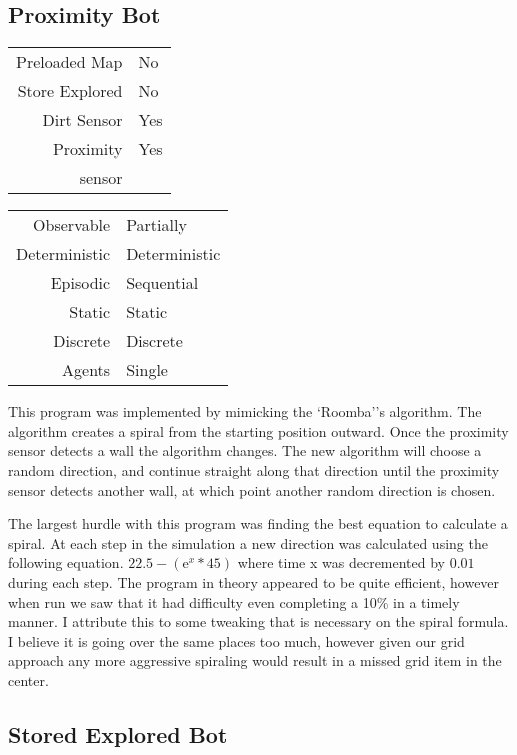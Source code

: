 \documentclass[letterpaper]{article}
\begin{document}
\subsection{Proximity Bot}

\begin{tabular}{ r | l }  
	Preloaded Map 		& No \\
	Store Explored 		& No \\
	Dirt Sensor 		& Yes \\
	Proximity  		 	& Yes \\
	sensor 					 \\
\end{tabular}
\quad
\begin{tabular}{ r | l }  
	Observable		& Partially		\\
	Deterministic	& Deterministic \\
	Episodic		& Sequential 	\\
	Static		 	& Static 		\\
	Discrete 		& Discrete 		\\
	Agents		 	& Single 		\\	
\end{tabular} 
 	
 		
 		
This program was implemented by mimicking the `Roomba''s algorithm.  The algorithm creates a spiral from the starting position outward.  Once the proximity sensor detects a wall the algorithm changes.  The new algorithm will choose a random direction, and continue straight along that direction until the proximity sensor detects another wall, at which point another random direction is chosen.  

The largest hurdle with this program was finding the best equation to calculate a spiral.  At each step in the simulation a new direction was calculated using the following equation.
$ 22.5 - (\mathrm {e} ^ x * 45)$
where time x was decremented by $0.01$ during each step.  The program in theory appeared to be quite efficient, however when run we saw that it had difficulty even completing a 10\% in a timely manner.  I attribute this to some tweaking that is necessary on the spiral formula.  I believe it is going over the same places too much, however given our grid approach any more aggressive spiraling would result in a missed grid item in the center.


\subsection{Stored Explored Bot}
\end{document}
